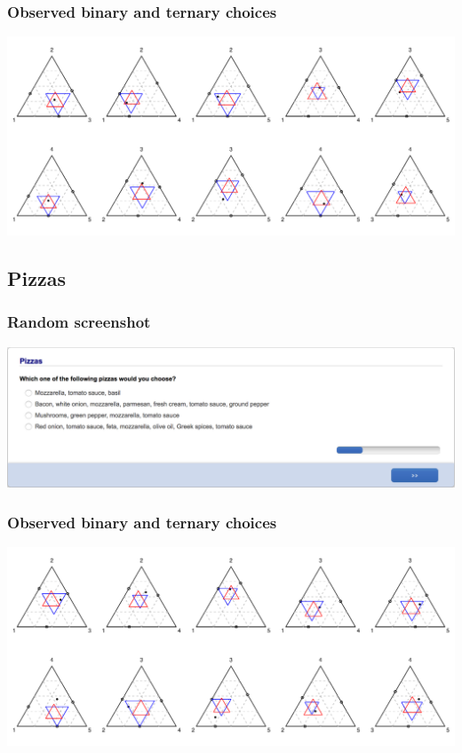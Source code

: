 \documentclass[11pt,letter]{article}
\begin{document}
\subsubsection*{Observed binary and ternary choices}

\includegraphics[width=15cm]{./Population_study_data/Simplexes/Star_pairs.pdf}

\pagebreak

\subsection{Pizzas}



\subsubsection*{Random screenshot}

\includegraphics[width=15cm]{Population_study_design/screenshot_Pizzas.png}

\subsubsection*{Observed binary and ternary choices}

\includegraphics[width=15cm]{./Population_study_data/Simplexes/Pizzas.pdf}
\end{document}
